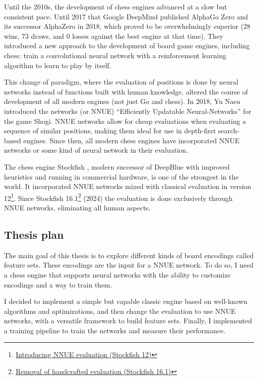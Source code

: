 Until the 2010s, the development of chess engines advanced at a slow but consistent pace. Until 2017 that Google DeepMind published AlphaGo Zero \cite{alphagozero:2017} and its successor AlphaZero \cite{alphazero:2017,alphazero:2018} in 2018, which proved to be overwhelmingly superior (28 wins, 73 draws, and 0 losses against the best engine at that time). They introduced a new approach to the development of board game engines, including chess: train a convolutional neural network with a reinforcement learning algorithm to learn to play by itself.

This change of paradigm, where the evaluation of positions is done by neural networks instead of functions built with human knowledge, altered the course of development of all modern engines (not just Go and chess). In 2018, Yu Nasu introduced the networks  (or NNUE) ``Efficiently Updatable Neural-Networks'' \cite{nnue:2018} for the game Shogi. NNUE networks allow for cheap evaluations when evaluating a sequence of similar positions, making them ideal for use in depth-first search-based engines. Since then, all modern chess engines have incorporated NNUE networks or some kind of neural network in their evaluation.

The chess engine Stockfish \cite{stockfish}, modern successor of DeepBlue with improved heuristics and running in commercial hardware, is one of the strongest in the world. It incorporated NNUE networks mixed with classical evaluation in version 12\footnote[1]{\href{https://stockfishchess.org/blog/2020/introducing-nnue-evaluation/}{Introducing NNUE evaluation (Stockfish 12)}}. Since Stockfish 16.1\footnote[2]{\href{https://stockfishchess.org/blog/2024/stockfish-16-1/}{Removal of handcrafted evaluation (Stockfish 16.1)}} (2024) the evaluation is done exclusively through NNUE networks, eliminating all human aspects.

\subsection{Thesis plan}

The main goal of this thesis is to explore different kinds of board encodings called feature sets. These encodings are the input for a NNUE network. To do so, I need a chess engine that supports neural networks with the ability to customize encodings and a way to train them.

I decided to implement a simple but capable classic engine based on well-known algorithms and optimizations, and then change the evaluation to use NNUE networks, with a versatile framework to build feature sets. Finally, I implemented a training pipeline to train the networks and measure their performance.

